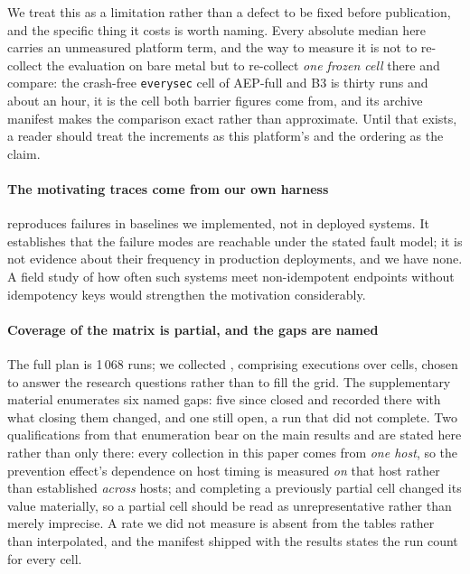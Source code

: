 We treat this as a limitation rather than a defect to be fixed before
publication, and the specific thing it costs is worth naming. Every absolute
median here carries an unmeasured platform term, and the way to measure it is
not to re-collect the evaluation on bare metal but to re-collect \emph{one frozen
cell} there and compare: the crash-free \texttt{everysec} cell of AEP-full and
B3 is thirty runs and about an hour, it is the cell both barrier figures come
from, and its archive manifest makes the comparison exact rather than
approximate. Until that exists, a reader should treat the increments as this
platform's and the ordering as the claim.

\paragraph{The motivating traces come from our own harness} 
reproduces failures in baselines we implemented, not in deployed systems. It
establishes that the failure modes are reachable under the stated fault model;
it is not evidence about their frequency in production deployments, and we have
none. A field study of how often such systems meet non-idempotent endpoints
without idempotency keys would strengthen the motivation considerably.

\paragraph{Coverage of the matrix is partial, and the gaps are named} The full
plan is 1\,068 runs; we collected \RunsCollected{}, comprising
\ExecutionsCollected{} executions over \CellsCollected{} cells, chosen to answer
the research questions rather than to fill the grid.
The supplementary material enumerates six named gaps: five since closed and
recorded there with what closing them changed, and one still open, a run that
did not complete.
Two qualifications from that enumeration bear on the main results
and are stated here rather than only there: every collection in this paper comes
from \emph{one host}, so the prevention effect's dependence on host timing is
measured \emph{on} that host rather than established \emph{across} hosts; and
completing a previously partial cell changed its value materially, so a partial
cell should be read as unrepresentative rather than merely imprecise. A rate we
did not measure is absent from the tables rather than interpolated, and the
manifest shipped with the results states the run count for every cell.


